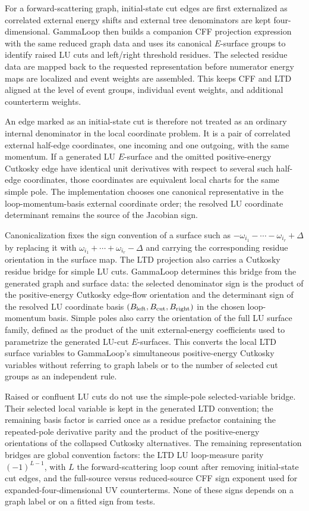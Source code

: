 \documentclass[11pt,a4paper]{report}
\begin{document}
For a forward-scattering graph, initial-state cut edges are first externalized
as correlated external energy shifts and external tree denominators are kept
four-dimensional.  GammaLoop then builds a companion CFF projection expression
with the same reduced graph data and uses its canonical \(E\)-surface groups to
identify raised LU cuts and left/right threshold residues.  The selected
residue data are mapped back to the requested representation before numerator
energy maps are localized and event weights are assembled.  This keeps CFF and
LTD aligned at the level of event groups, individual event weights, and
additional counterterm weights.

An edge marked as an initial-state cut is therefore not treated as an ordinary
internal denominator in the local coordinate problem.  It is a pair of
correlated external half-edge coordinates, one incoming and one outgoing, with
the same momentum.  If a generated LU \(E\)-surface and the omitted
positive-energy Cutkosky edge have identical unit derivatives with respect to
several such half-edge coordinates, those coordinates are equivalent local
charts for the same simple pole.  The implementation chooses one canonical
representative in the loop-momentum-basis external coordinate order; the
resolved LU coordinate determinant remains the source of the Jacobian sign.

Canonicalization fixes the sign convention of a surface such as
\(-\omega_{i_1}-\cdots-\omega_{i_r}+\Delta\) by replacing it with
\(\omega_{i_1}+\cdots+\omega_{i_r}-\Delta\) and carrying the corresponding
residue orientation in the surface map.  The LTD projection also carries a
Cutkosky residue bridge for simple LU cuts.  GammaLoop determines this bridge
from the generated graph and surface data:
the selected denominator sign is the product of the positive-energy Cutkosky
edge-flow orientation and the determinant sign of the resolved LU coordinate
basis \((B_{\rm left},B_{\rm cut},B_{\rm right})\) in the chosen loop-momentum
basis.  Simple poles also carry the orientation of the full LU surface family,
defined as the product of the unit external-energy coefficients used to
parametrize the generated LU-cut \(E\)-surfaces.  This converts the local LTD
surface variables to GammaLoop's simultaneous positive-energy Cutkosky
variables without referring to graph labels or to the number of selected cut
groups as an independent rule.

Raised or confluent LU cuts do not use the simple-pole selected-variable
bridge.  Their selected local variable is kept in the generated LTD convention;
the remaining basis factor is carried once as a residue prefactor containing
the repeated-pole derivative parity and the product of the positive-energy
orientations of the collapsed Cutkosky alternatives.  The remaining
representation bridges are global convention factors: the LTD LU loop-measure
parity \((-1)^{L-1}\), with \(L\) the forward-scattering loop count after
removing initial-state cut edges, and the full-source versus reduced-source CFF
sign exponent used for expanded-four-dimensional UV counterterms.  None of
these signs depends on a graph label or on a fitted sign from tests.
\end{document}
